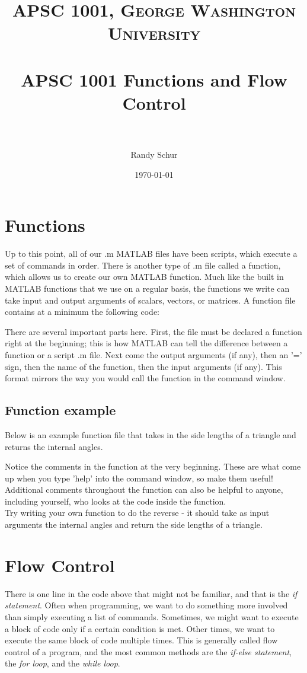 \documentclass[paper=a4, fontsize=11pt]{scrartcl} %
\title{	
\normalfont \normalsize 
\textsc{APSC 1001, George Washington University} \\ [25pt] %
\horrule{0.5pt} \\[0.4cm] %
\huge APSC 1001 Functions and Flow Control\\ %
\horrule{2pt} \\[0.5cm] %
}
\author{\normalsize Randy Schur } %
\date{\normalsize \today } %
\numberwithin{equation}{section} %
\numberwithin{figure}{section} %
\numberwithin{table}{section} %
\begin{document}
\maketitle %

\section{Functions}
Up to this point, all of our .m MATLAB files have been scripts, which execute a set of commands in order.  There is another type of .m file called a function, which allows us to create our own MATLAB function. Much like the built in MATLAB functions that we use on a regular basis, the functions we write can take input and output arguments of scalars, vectors, or matrices. A function file contains at a minimum the following code:



There are several important parts here. 
First, the file must be declared a function right at the beginning; this is how MATLAB can tell the difference between a function or a script .m file. 
Next come the output arguments (if any), then an '=' sign, then the name of the function, then the input arguments (if any). 
This format mirrors the way you would call the function in the command window. 

\subsection{Function example}
Below is an example function file that takes in the side lengths of a triangle and returns the internal angles. 


Notice the comments in the function at the very beginning. 
These are what come up when you type 'help' into the command window, so make them useful! 
Additional comments throughout the function can also be helpful to anyone, including yourself, who looks at the code inside the function.\\

Try writing your own function to do the reverse - it should take as input arguments the internal angles and return the side lengths of a triangle.


\section{Flow Control}
There is one line in the code above that might not be familiar, and that is the \textit{if statement}. 
Often when programming, we want to do something more involved than simply executing a list of commands. 
Sometimes, we might want to execute a block of code only if a certain condition is met.
Other times, we want to execute the same block of code multiple times.
This is generally called flow control of a program, and the most common methods are the \textit{if-else statement}, the \textit{for loop}, and the \textit{while loop}.
\end{document}
